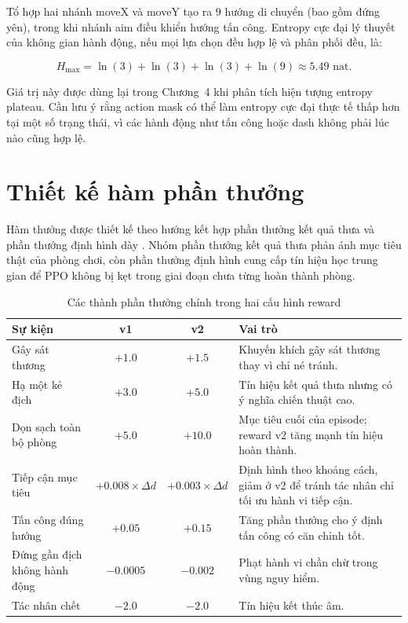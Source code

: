 Tổ hợp hai nhánh moveX và moveY tạo ra 9 hướng di chuyển (bao gồm đứng yên), trong khi nhánh aim điều khiển hướng tấn công. Entropy cực đại lý thuyết của không gian hành động, nếu mọi lựa chọn đều hợp lệ và phân phối đều, là:

\begin{equation}
    H_{\max} = \ln(3) + \ln(3) + \ln(3) + \ln(9) \approx 5.49 \text{ nat}.
    \label{eq:max_entropy}
\end{equation}

Giá trị này được dùng lại trong Chương~4 khi phân tích hiện tượng entropy plateau. Cần lưu ý rằng action mask có thể làm entropy cực đại thực tế thấp hơn tại một số trạng thái, vì các hành động như tấn công hoặc dash không phải lúc nào cũng hợp lệ.

\section{Thiết kế hàm phần thưởng}

Hàm thưởng được thiết kế theo hướng kết hợp phần thưởng kết quả thưa và phần thưởng định hình dày \cite{Ibrahim2024}. Nhóm phần thưởng kết quả thưa phản ánh mục tiêu thật của phòng chơi, còn phần thưởng định hình cung cấp tín hiệu học trung gian để PPO không bị kẹt trong giai đoạn chưa từng hoàn thành phòng.

\begin{table}[H]
    \centering
    \small
    \caption{Các thành phần thưởng chính trong hai cấu hình reward}
    \label{tab:reward_components}
    \begin{tabular}{|p{4.4cm}|c|c|p{5.2cm}|}
        \hline
        \textbf{Sự kiện} & \textbf{v1} & \textbf{v2} & \textbf{Vai trò} \\
        \hline
        Gây sát thương & $+1.0$ & $+1.5$ & Khuyến khích gây sát thương thay vì chỉ né tránh. \\
        \hline
        Hạ một kẻ địch & $+3.0$ & $+5.0$ & Tín hiệu kết quả thưa nhưng có ý nghĩa chiến thuật cao. \\
        \hline
        Dọn sạch toàn bộ phòng & $+5.0$ & $+10.0$ & Mục tiêu cuối của episode; reward v2 tăng mạnh tín hiệu hoàn thành. \\
        \hline
        Tiếp cận mục tiêu & $+0.008 \times \Delta d$ & $+0.003 \times \Delta d$ & Định hình theo khoảng cách, giảm ở v2 để tránh tác nhân chỉ tối ưu hành vi tiếp cận. \\
        \hline
        Tấn công đúng hướng & $+0.05$ & $+0.15$ & Tăng phần thưởng cho ý định tấn công có căn chỉnh tốt. \\
        \hline
        Đứng gần địch không hành động & $-0.0005$ & $-0.002$ & Phạt hành vi chần chừ trong vùng nguy hiểm. \\
        \hline
        Tác nhân chết & $-2.0$ & $-2.0$ & Tín hiệu kết thúc âm. \\
        \hline
    \end{tabular}
\end{table}

